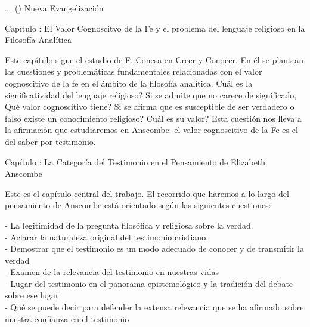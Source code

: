 \documentclass[11pt]{article}
\begin{document}
{\begin{spacing}{1.5}
\tab \tab \tab {}. 
. 
()
Nueva Evangelización

\tab {}

\tab {}

{\LARGE Capítulo : 
El Valor Cognoscitvo de la Fe y el problema del lenguaje religioso en la Filosofía Analítica}

\begin{spacing}{1}
Este capítulo sigue el estudio de F. Conesa en Creer y Conocer. En él se plantean las cuestiones y problemáticas fundamentales relacionadas con el valor cognoscitivo de la fe en el ámbito de la filosofía analítica.  \textquestiondown{}Cuál es la significatividad del lenguaje religioso? Si se admite que no carece de significado, \textquestiondown{}Qué valor cognoscitivo tiene? Si se afirma que es susceptible de ser verdadero o falso \textquestiondown{}existe un conocimiento religioso? \textquestiondown{}Cuál es su valor? Esta cuestión nos lleva a la afirmación que estudiaremos en Anscombe: el valor cognoscitivo de la Fe es el del saber por testimonio.
\end{spacing}





{\LARGE Capítulo : 
La Categoría del Testimonio en el Pensamiento de Elizabeth Anscombe}
\begin{spacing}{1}
Este es el capítulo central del trabajo. El recorrido que haremos a lo largo del pensamiento de Anscombe está orientado según las siguientes cuestiones:

\noindent- La legitimidad de la pregunta filosófica y religiosa sobre la verdad.\\
- Aclarar la naturaleza original del testimonio cristiano.\\
- Demostrar que el testimonio es un modo adecuado de conocer y de transmitir la verdad\\
- Examen de la relevancia del testimonio en nuestras vidas\\
- Lugar del testimonio en el panorama epistemológico y la tradición del debate sobre ese lugar\\
- Qué se puede decir para defender la extensa relevancia que se ha afirmado sobre nuestra confianza en el testimonio


\end{spacing}
\end{spacing}}
\end{document}
